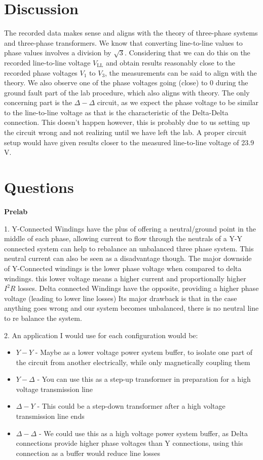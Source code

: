 \documentclass[]{report}
\begin{document}
\section*{Discussion}

The recorded data makes sense and aligns with the theory of three-phase systems and three-phase transformers. We know that converting line-to-line values to phase values involves a division by $\sqrt{3}$. Considering that we can do this on the recorded line-to-line voltage $V_\text{LL}$ and obtain results reasonably close to the recorded phase voltages $V_1$ to $V_3$, the measurements can be said to align with the theory. We also observe one of the phase voltages going (close) to 0 during the ground fault part of the lab procedure, which also aligns with theory. The only concerning part is the $\Delta-\Delta$ circuit, as we expect the phase voltage to be similar to the line-to-line voltage as that is the characteristic of the Delta-Delta connection. This doesn't happen however, this is probably due to us setting up the circuit wrong and not realizing until we have left the lab. A proper circuit setup would have given results closer to the measured line-to-line voltage of 23.9 V.

\section*{Questions}

\textbf{Prelab}

1. Y-Connected Windings have the plus of offering a neutral/ground point in the middle of each phase, allowing current to flow through the neutrals of a Y-Y connected system can help to rebalance an unbalanced three phase system. This neutral current can also be seen as a disadvantage though. The major downside of Y-Connected windings is the lower phase voltage when compared to delta windings. this lower voltage means a higher current and proportionally higher $I^2 R$ losses.
Delta connected Windings have the opposite, providing a higher phase voltage (leading to lower line losses) Its major drawback is that in the case anything goes wrong and our system becomes unbalanced, there is no neutral line to re balance the system.

2. An application I would use for each configuration would be:
\begin{itemize}
	\item $Y-Y$  - Maybe as a lower voltage power system buffer, to isolate one part of the circuit from another electrically, while only magnetically coupling them
	\item $Y-\Delta$ - You can use this as a step-up transformer in preparation for a high voltage transmission line
	\item $\Delta-Y$ - This could be a step-down transformer after a high voltage transmission line ends
	\item $\Delta-\Delta$ - We could use this as a high voltage power system buffer, as Delta connections provide higher phase voltages than Y connections, using this connection as a buffer would reduce line losses
\end{itemize}
\end{document}
